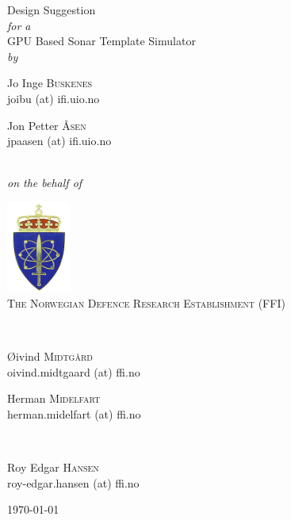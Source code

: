 \documentclass[
   article                                      %
 , 12pt                                         %
 , xelatex                                      %
 , bibtex                                       %
 , layout
]{common/mytemplate}
\begin{document}

\thispagestyle{empty}

\begin{center}

{\Large Design Suggestion}\\[0.2cm]
{\itshape for a}\\[0.2cm]
{\Large GPU Based Sonar Template Simulator}\\[2cm]
{\itshape by}\\[0.2cm]
\begin{minipage}{0.35\textwidth}\small\centering
Jo Inge \textsc{Buskenes}\\
\textnormal{\color{SeaGreen}joibu (at) ifi.uio.no}
\end{minipage}
\begin{minipage}{0.35\textwidth}\small\centering
Jon Petter \textsc{Åsen}\\
\textnormal{\color{SeaGreen}jpaasen (at) ifi.uio.no}
\end{minipage}\\[2cm]
{\itshape on the behalf of}\\[0.2cm]
\begin{minipage}[t]{0.49\textwidth}\centering
  \centering\includegraphics[height=3cm]{gfx/FFILogo.png}\\
  \textsc{The Norwegian Defence Research Establishment (FFI)}
\end{minipage}\\[0.5cm]
\begin{minipage}[t]{0.4\textwidth}\small\centering
Øivind \textsc{Midtgård}\\
\textnormal{\color{SeaGreen}oivind.midtgaard (at) ffi.no}
\end{minipage}
\begin{minipage}[t]{0.4\textwidth}\small\centering
Herman \textsc{Midelfart}\\
\textnormal{\color{SeaGreen}herman.midelfart (at) ffi.no}
\end{minipage}\\[0.3cm]
\begin{minipage}{0.32\textwidth}\small\centering
Roy Edgar \textsc{Hansen}\\
\textnormal{\color{SeaGreen}roy-edgar.hansen (at) ffi.no}
\end{minipage}
\vfill
\small
\today
\end{center}
\end{document}
